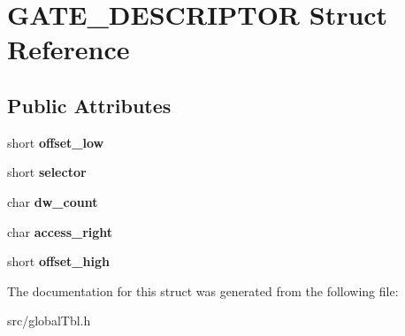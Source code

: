 \hypertarget{struct_g_a_t_e___d_e_s_c_r_i_p_t_o_r}{}\section{G\+A\+T\+E\+\_\+\+D\+E\+S\+C\+R\+I\+P\+T\+O\+R Struct Reference}
\label{struct_g_a_t_e___d_e_s_c_r_i_p_t_o_r}
\subsection*{Public Attributes}
\begin{DoxyCompactItemize}
\item 
\hypertarget{struct_g_a_t_e___d_e_s_c_r_i_p_t_o_r_afe54ca18993705f79547bde4b083344f}{}short {\bfseries offset\+\_\+low}\label{struct_g_a_t_e___d_e_s_c_r_i_p_t_o_r_afe54ca18993705f79547bde4b083344f}

\item 
\hypertarget{struct_g_a_t_e___d_e_s_c_r_i_p_t_o_r_a2e0dc54e9cd5caa394aecb1453e9966a}{}short {\bfseries selector}\label{struct_g_a_t_e___d_e_s_c_r_i_p_t_o_r_a2e0dc54e9cd5caa394aecb1453e9966a}

\item 
\hypertarget{struct_g_a_t_e___d_e_s_c_r_i_p_t_o_r_a8938194412d61ebdd8e3d8fc76055c98}{}char {\bfseries dw\+\_\+count}\label{struct_g_a_t_e___d_e_s_c_r_i_p_t_o_r_a8938194412d61ebdd8e3d8fc76055c98}

\item 
\hypertarget{struct_g_a_t_e___d_e_s_c_r_i_p_t_o_r_a311c4adc1a6d74f1a7519a18f82fd9cd}{}char {\bfseries access\+\_\+right}\label{struct_g_a_t_e___d_e_s_c_r_i_p_t_o_r_a311c4adc1a6d74f1a7519a18f82fd9cd}

\item 
\hypertarget{struct_g_a_t_e___d_e_s_c_r_i_p_t_o_r_aa745693aa7f3412223920cf8edbc61b2}{}short {\bfseries offset\+\_\+high}\label{struct_g_a_t_e___d_e_s_c_r_i_p_t_o_r_aa745693aa7f3412223920cf8edbc61b2}

\end{DoxyCompactItemize}


The documentation for this struct was generated from the following file\+:\begin{DoxyCompactItemize}
\item 
src/global\+Tbl.\+h\end{DoxyCompactItemize}
